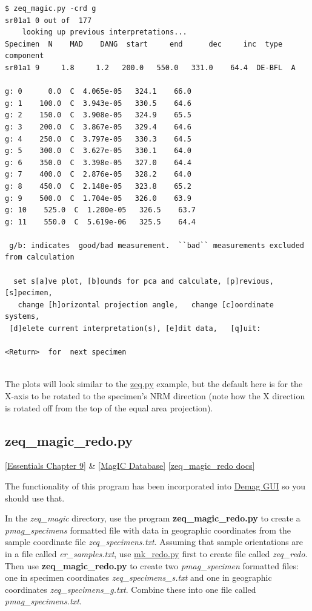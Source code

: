 \documentclass[11pt]{book}
\begin{document}
{\begin{verbatim}
$ zeq_magic.py -crd g
sr01a1 0 out of  177
    looking up previous interpretations...
Specimen  N    MAD    DANG  start     end      dec     inc  type  component
sr01a1 9     1.8     1.2   200.0   550.0   331.0    64.4  DE-BFL  A

g: 0      0.0  C  4.065e-05   324.1    66.0
g: 1    100.0  C  3.943e-05   330.5    64.6
g: 2    150.0  C  3.908e-05   324.9    65.5
g: 3    200.0  C  3.867e-05   329.4    64.6
g: 4    250.0  C  3.797e-05   330.3    64.5
g: 5    300.0  C  3.627e-05   330.1    64.0
g: 6    350.0  C  3.398e-05   327.0    64.4
g: 7    400.0  C  2.876e-05   328.2    64.0
g: 8    450.0  C  2.148e-05   323.8    65.2
g: 9    500.0  C  1.704e-05   326.0    63.9
g: 10    525.0  C  1.200e-05   326.5    63.7
g: 11    550.0  C  5.619e-06   325.5    64.4

 g/b: indicates  good/bad measurement.  ``bad`` measurements excluded from calculation

  set s[a]ve plot, [b]ounds for pca and calculate, [p]revious, [s]pecimen,
   change [h]orizontal projection angle,   change [c]oordinate systems,
 [d]elete current interpretation(s), [e]dit data,   [q]uit:

<Return>  for  next specimen


\end{verbatim}

The plots will look similar to the \href{#zeq.py}{zeq.py} example, but the default here is for the X-axis to be rotated to the specimen's NRM direction (note how the X direction is rotated off from the top of the equal area projection).




\subsection{zeq\_magic\_redo.py}
\href{http://earthref.org/MAGIC/books/Tauxe/Essentials/WebBook3ch9.html#ch9}{[Essentials Chapter 9]}  \& \href{#MagICDatabase}{[MagIC Database]}
\href{https://github.com/PmagPy/PmagPy/blob/master/programs/zeq_magic_redo.py}{[zeq\_magic\_redo docs]}

The functionality of this program has been incorporated into \href{#demag_gui.py}{Demag GUI} so you should use that.   


In the {\it zeq\_magic} directory, use the program {\bf zeq\_magic\_redo.py} to create a {\it pmag\_specimens} formatted file with data in geographic coordinates from the sample coordinate file {\it zeq\_specimens.txt}.
Assuming that sample orientations are in a file called {\it er\_samples.txt}, use \href{#mk_redo.py}{mk\_redo.py} first to create file called {\it zeq\_redo}.  Then use
{\bf zeq\_magic\_redo.py} to create two {\it pmag\_specimen} formatted files:  one in specimen coordinates {\it zeq\_specimens\_s.txt} and one in geographic coordinates {\it zeq\_specimens\_g.txt}.   Combine these into one file called {\it pmag\_specimens.txt}.

}
\end{document}
